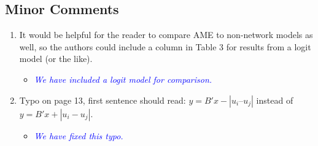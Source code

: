 \subsection{Minor Comments}

\begin{enumerate}
	\item It would be helpful for the reader to compare AME to non-network models as well, so the authors could include a column in Table 3 for results from a logit model (or the like). 
	\begin{itemize}
		\item \textcolor{blue}{ \emph{
		We have included a logit model for comparison.
		}}
	\end{itemize}		
	\item Typo on page 13, first sentence should read: $y = B'x - |u_i – u_j|$ instead of $y = B'x + |u_i - u_j|$.
	\begin{itemize}
		\item \textcolor{blue}{ \emph{
		We have fixed this typo.
		}}
	\end{itemize}		
\end{enumerate}

